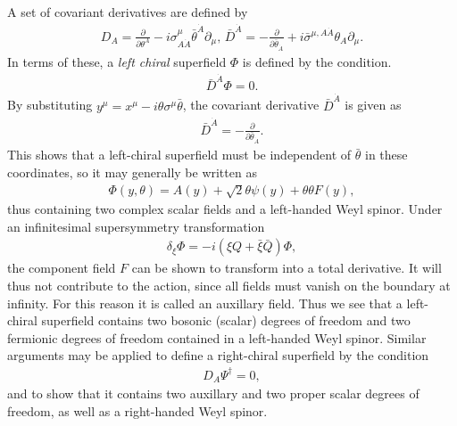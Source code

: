  A set of covariant derivatives are defined by
\begin{align}
	D_A = \frac{\partial}{\partial \theta^A} - i\sigma^\mu_{A \dot A}\bar\theta^{\dot A}\partial_\mu, \, \bar D^{\dot A} = -\frac{\partial}{\partial \bar \theta_{\dot A}} + i\bar\sigma^{\mu,A \dot A}\theta_A \partial_\mu.
\end{align}
In terms of these, a {\it left chiral} superfield $\Phi$ is defined by the condition.
\begin{align}
	\bar D^{\dot A} \Phi = 0.
\end{align}
By substituting $y^\mu = x^\mu - i\theta\sigma^\mu \bar \theta$, the covariant derivative $\bar D^{\dot A}$ is given as
\begin{align}
	\bar D^{\dot A} = -\frac{\partial}{\partial \bar\theta_{\dot A}}.
\end{align}
This shows that a left-chiral superfield must be independent of $\bar \theta$ in these coordinates, so it may generally be written as
\begin{align}
	\Phi(y, \theta) = A(y) + \sqrt{2}\theta\psi(y) + \theta\theta F(y), 
\end{align}
thus containing two complex scalar fields and a left-handed Weyl spinor. Under an infinitesimal supersymmetry transformation
\begin{align}
	\delta_\xi \Phi = -i(\xi Q + \bar\xi\bar Q)\Phi,
\end{align}
the component field $F$ can be shown to transform into a total derivative. It will thus not contribute to the action, since all fields must vanish on the boundary at infinity. For this reason it is called an auxillary field. Thus we see that a left-chiral superfield contains two bosonic (scalar) degrees of freedom and two fermionic degrees of freedom contained in a left-handed Weyl spinor. Similar arguments may be applied to define a right-chiral superfield by the condition
\begin{align}
	D_A \Psi^\dag = 0,
\end{align}
and to show that it contains two auxillary and two proper scalar degrees of freedom, as well as a right-handed Weyl spinor. 


